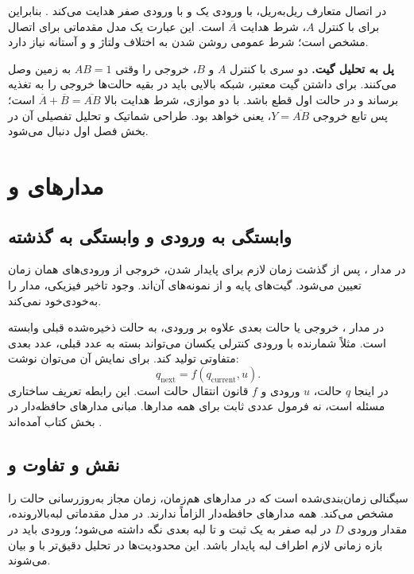 در اتصال متعارف ریل‌به‌ریل،  با ورودی یک و  با ورودی صفر
هدایت می‌کند \cite[بخش ]{weste}\cite[اسلاید ۲۱]{intro}.
بنابراین برای  با کنترل \(A\)، شرط هدایت \(\overline{A}\) است.
این عبارت یک مدل مقدماتی برای اتصال مشخص است؛ شرط عمومی روشن شدن به اختلاف ولتاژ
 و  و آستانه نیاز دارد.

\textbf{پل به تحلیل گیت.} دو  سری با کنترل \(A\) و \(B\)،
خروجی را وقتی \(AB=1\) به زمین وصل می‌کنند. برای داشتن گیت معتبر،
شبکه بالایی باید در بقیه حالت‌ها خروجی را به تغذیه برساند و در حالت اول قطع باشد.
با دو  موازی، شرط هدایت بالا
\(\overline{A}+\overline{B}=\overline{AB}\) است؛
پس تابع خروجی \(Y=\overline{AB}\)، یعنی  خواهد بود.
طراحی شماتیک و تحلیل تفصیلی آن در بخش فصل اول دنبال می‌شود.

\section{مدارهای  و }
\subsection{وابستگی به ورودی و وابستگی به گذشته}
در مدار ، پس از گذشت زمان لازم برای پایدار شدن،
خروجی از ورودی‌های همان زمان تعیین می‌شود. گیت‌های پایه و 
از نمونه‌های آن‌اند. وجود تاخیر فیزیکی، مدار را به‌خودی‌خود  نمی‌کند.

در مدار ، خروجی یا حالت بعدی علاوه بر ورودی، به حالت ذخیره‌شده
قبلی وابسته است. مثلاً شمارنده با ورودی کنترلی یکسان می‌تواند بسته به عدد قبلی،
عدد بعدی متفاوتی تولید کند. برای نمایش آن می‌توان نوشت:
\begin{equation}\label{eq:foundation-state}
q_{\mathrm{next}}=f(q_{\mathrm{current}},u).
\end{equation}
در اینجا \(q\) حالت، \(u\) ورودی و \(f\) قانون انتقال حالت است.
این رابطه تعریف ساختاری مسئله است، نه فرمول عددی ثابت برای همه مدارها.
مبانی مدارهای حافظه‌دار در بخش  کتاب آمده‌اند \cite{weste}.

\subsection{نقش  و تفاوت  و }
 سیگنالی زمان‌بندی‌شده است که در مدارهای هم‌زمان، زمان مجاز
به‌روزرسانی حالت را مشخص می‌کند. همه مدارهای حافظه‌دار الزاماً  ندارند.
در مدل مقدماتی  لبه‌بالارونده، مقدار ورودی \(D\) در لبه
صفر به یک  ثبت و تا لبه بعدی نگه داشته می‌شود؛ ورودی باید در
بازه زمانی لازم اطراف لبه پایدار باشد. این محدودیت‌ها در تحلیل دقیق‌تر با
 و  بیان می‌شوند.

